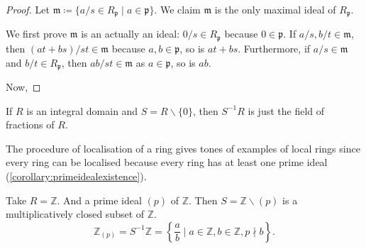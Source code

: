 \begin{proof}
    Let \(\mathfrak{m} \coloneq \{a/s \in R_\mathfrak{p} \mid a \in \mathfrak{p}\}\). We claim \(\mathfrak{m}\) is the only maximal ideal of \(R_\mathfrak{p}\).

We first prove \(\mathfrak{m}\) is an actually an ideal: \(0/s \in R_\mathfrak{p}\) because \(0 \in \mathfrak{p}\). If \(a/s, b/t \in \mathfrak{m}\), then \((at+bs)/st \in \mathfrak{m}\) because \(a, b \in \mathfrak{p}\), so is \(at + bs\). Furthermore, if \(a/s \in \mathfrak{m}\) and \(b/t \in R_\mathfrak{p}\), then \(ab/st \in \mathfrak{m}\) as \(a \in \mathfrak{p}\), so is \(ab\).

Now, 
\end{proof}
\begin{remark}
    If \(R\) is an integral domain and  \(S = R \smallsetminus \{0\}\), then \(S^{-1}R\) is just the field of fractions of  \(R\).
\end{remark}

The procedure of localisation of a ring gives tones of examples of local rings since every ring can be localised because every ring has at least one prime ideal (\autoref{corollary:primeidealexistence}).
\begin{example}
    Take \( R = \mathbb{Z} \). And a prime ideal \( (p) \) of  \( \mathbb{Z} \). Then \( S = \mathbb{Z} \smallsetminus (p) \) is a multiplicatively closed subset of \( \mathbb{Z} \). 
    \[
        \mathbb{Z}_{(p)} = S^{-1}\mathbb{Z} = \left\{\frac{a}{b} \mid a \in \mathbb{Z}, b \in \mathbb{Z}, p \nmid b\right\}.
    \] 
\end{example}
